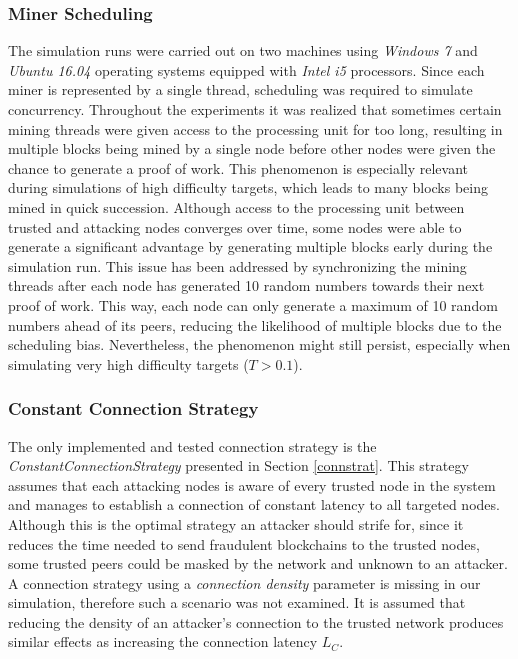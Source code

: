 \documentclass[a4paper,12pt,twoside]{report}
\begin{document}
\subsubsection{Miner Scheduling}
The simulation runs were carried out on two machines using \textit{Windows 7} and \textit{Ubuntu 16.04} operating systems equipped with \textit{Intel i5} processors. Since each miner is represented by a single thread, scheduling was required to simulate concurrency. Throughout the experiments it was realized that sometimes certain mining threads were given access to the processing unit for too long, resulting in multiple blocks being mined by a single node before other nodes were given the chance to generate a proof of work. This phenomenon is especially relevant during simulations of high difficulty targets, which leads to many blocks being mined in quick succession. Although access to the processing unit between trusted and attacking nodes converges over time, some nodes were able to generate a significant advantage by generating multiple blocks early during the simulation run. This issue has been addressed by synchronizing the mining threads after each node has generated 10 random numbers towards their next proof of work. This way, each node can only generate a maximum of 10 random numbers ahead of its peers, reducing the likelihood of multiple blocks due to the scheduling bias. Nevertheless, the phenomenon might still persist, especially when simulating very high difficulty targets ($T > 0.1$).
\subsubsection{Constant Connection Strategy}
The only implemented and tested connection strategy is the \textit{ConstantConnectionStrategy} presented in Section \ref{connstrat}. This strategy assumes that each attacking nodes is aware of every trusted node in the system and manages to establish a connection of constant latency to all targeted nodes. Although this is the optimal strategy an attacker should strife for, since it reduces the time needed to send fraudulent blockchains to the trusted nodes, some trusted peers could be masked by the network and unknown to an attacker. A connection strategy using a \textit{connection density} parameter is missing in our simulation, therefore such a scenario was not examined. It is assumed that reducing the density of an attacker's connection to the trusted network produces similar effects as increasing the connection latency $L_C$.
\end{document}
